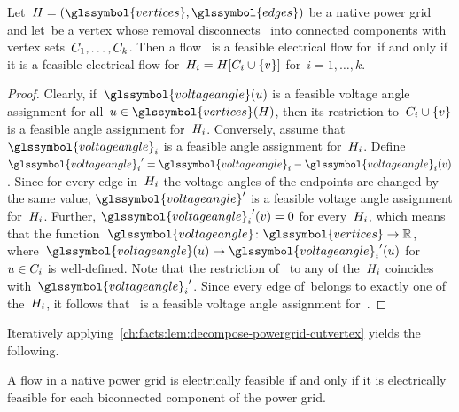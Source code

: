 %
\begin{lemma} 
    Let~$\subgraph = (\glssymbol{vertices}, \glssymbol{edges})$ be a native
    power grid and let~\vertex be a vertex whose removal disconnects~\subgraph
    into connected components with vertex sets~$C_1, \dots,
    C_k$. Then a flow~ is a feasible
    electrical flow for~\subgraph if and only if it is a feasible electrical
    flow for~$H_i =
    H [ C_i \cup \{ v \}]$ for~$i = 1, \dots, k$.
    \label{ch:facts:lem:decompose-powergrid-cutvertex}
\end{lemma}
%
\begin{proof}
    Clearly, if~$\glssymbol{voltageangle}(\vertexa)$ is a feasible voltage angle assignment
    for all~$\vertexa\in\glssymbol{vertices}(\subgraph)$,
    then its restriction to~$C_i \cup \{ v \}$ is a
    feasible angle assignment for~$H_i$. Conversely, assume
    that~$\glssymbol{voltageangle}_i$ is a feasible angle assignment for~$H_i$.
    Define~${\glssymbol{voltageangle}_i}' = \glssymbol{voltageangle}_i -
    \glssymbol{voltageangle}_i (\vertex)$. Since for every edge in~$H_i$
    the voltage angles of the endpoints are changed by the same value,
    ${\glssymbol{voltageangle}}'$ is a feasible voltage angle assignment
    for~$H_i$. Further, ${\glssymbol{voltageangle}_i}'(\vertex) = 0$ for
    every~$H_i$, which means that the function~$\glssymbol{voltageangle}
    \colon
    \glssymbol{vertices}\to \reals$, where~$\glssymbol{voltageangle}(\vertexa)\mapsto
    {\glssymbol{voltageangle}_i}'(\vertexa)$ for~$u \in
    C_i$ is well-defined. Note that the restriction
    of~ to any of the~$H_i$ coincides
    with~${\glssymbol{voltageangle}_i}'$.  Since every edge of~\subgraph belongs
    to exactly one of the~$H_i$, it follows
    that~ is a feasible voltage angle assignment
    for~\subgraph.
\end{proof}
%
Iteratively applying~\cref{ch:facts:lem:decompose-powergrid-cutvertex}
yields the following.
%
\begin{corollary}
    A flow in a native power grid is electrically feasible if and only if it is
    electrically feasible for each biconnected component of the power grid.
    \label{ch:facts:cor:electrical-feasible-blocks}
\end{corollary}

